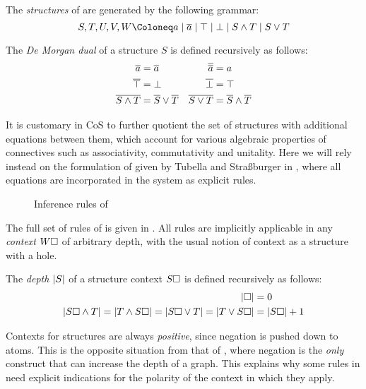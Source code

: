 \begin{definition}[Structure]
  The \emph{structures} of  are generated by the following grammar:
  $$S, T, U, V, W \Coloneq a \mid \dmdual{a} \mid \top \mid \bot \mid S \land T
  \mid S \lor T$$
\end{definition}

\begin{definition}
  The \emph{De Morgan dual} of a structure $S$ is defined recursively as
  follows:
  \begin{align*}
    \overline{a} &= \overline{a} & \overline{\overline{a}} &= a \\
    \overline{\top} &= \bot & \overline{\bot} &= \top \\
    \overline{S \land T} &= \overline{S} \lor \overline{T} & \overline{S \lor T} &= \overline{S} \land \overline{T}
  \end{align*}
\end{definition}

It is customary in CoS to further quotient the set of structures with additional
equations between them, which account for various algebraic properties of
connectives such as associativity, commutativity and unitality. Here we will
rely instead on the formulation of  given by Tubella and Straßburger in
\cite{tubella:hal-02390267}, where all equations are incorporated in the system
as explicit rules.

\begin{figure*}
  
  \caption{Inference rules of }
\end{figure*}

The full set of rules of  is given in . All rules are
implicitly applicable in any \emph{context} $W\square$ of arbitrary depth, with
the usual notion of context as a structure with a hole.

\begin{definition}[Depth]
  The \emph{depth} $\left|S\right|$ of a structure context $S\square$ is defined
  recursively as follows:
  \begin{align*}
    \left|\square\right| &= 0 \\
    \left|S\square \land T\right| = \left|T \land S\square\right| = \left|S\square \lor T\right| = \left|T \lor S\square\right| &= \left|S\square\right| + 1
  \end{align*}
\end{definition}

\begin{remark}
  Contexts for structures are always \emph{positive}, since negation is pushed
down to atoms. This is the opposite situation from that of , where
negation is the \emph{only} construct that can increase the depth of a graph.
This explains why some rules in  need explicit indications for the
polarity of the context in which they apply.
\end{remark}


